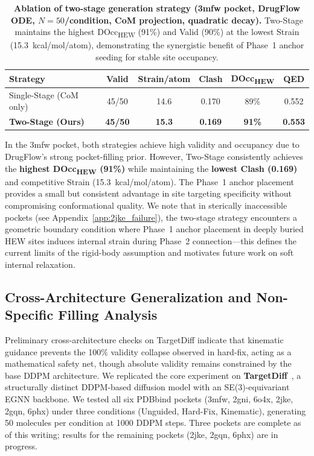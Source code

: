 \documentclass{article}
\begin{document}
\begin{table}[H]
  \centering
  \caption{\textbf{Ablation of two-stage generation strategy (3mfw pocket,
    DrugFlow ODE, $N=50$/condition, CoM projection, quadratic decay).}
    Two-Stage maintains the highest DOcc\textsubscript{HEW} (91\%) and
    Valid (90\%) at the lowest Strain (15.3~kcal/mol/atom), demonstrating
    the synergistic benefit of Phase~1 anchor seeding for stable site
    occupancy.}
  \label{tab:ablation_two_stage}
  \small
  \begin{tabular}{l c c c c c}
    \toprule
    \textbf{Strategy} & \textbf{Valid} & \textbf{Strain/atom} & \textbf{Clash}
    & \textbf{DOcc\textsubscript{HEW}} & \textbf{QED} \\
    \midrule
    Single-Stage (CoM only) & 45/50 & 14.6 & 0.170 & 89\% & 0.552 \\
    \textbf{Two-Stage (Ours)} & \textbf{45/50} & \textbf{15.3} & \textbf{0.169}
    & \textbf{91\%} & \textbf{0.553} \\
    \bottomrule
  \end{tabular}
\end{table}

In the 3mfw pocket, both strategies achieve high validity and occupancy due to
DrugFlow's strong pocket-filling prior.  However, Two-Stage consistently
achieves the \textbf{highest DOcc\textsubscript{HEW} (91\%)} while maintaining
the \textbf{lowest Clash (0.169)} and competitive Strain (15.3~kcal/mol/atom).
The Phase~1 anchor placement provides a small but consistent advantage in site
targeting specificity without compromising conformational quality.  We note
that in sterically inaccessible pockets (see Appendix~\ref{app:2jke_failure}),
the two-stage strategy encounters a geometric boundary condition where Phase~1
anchor placement in deeply buried HEW sites induces internal strain during
Phase~2 connection---this defines the current limits of the rigid-body
assumption and motivates future work on soft internal relaxation.

\subsection{Cross-Architecture Generalization and Non-Specific Filling Analysis}
\label{sec:cross_arch}

Preliminary cross-architecture checks on TargetDiff indicate that kinematic
guidance prevents the 100\% validity collapse observed in hard-fix, acting
as a mathematical safety net, though absolute validity remains constrained
by the base DDPM architecture.  We replicated the core experiment on
\textbf{TargetDiff}~\cite{guan2023targetdiff}, a structurally distinct
DDPM-based diffusion model with an SE(3)-equivariant EGNN backbone.  We tested
all six PDBbind pockets (3mfw, 2gni, 6o4x, 2jke, 2gqn, 6phx) under three
conditions (Unguided, Hard-Fix, Kinematic), generating 50 molecules per
condition at 1000 DDPM steps.  Three pockets are complete as of this writing;
results for the remaining pockets (2jke, 2gqn, 6phx) are in progress.
\end{document}
